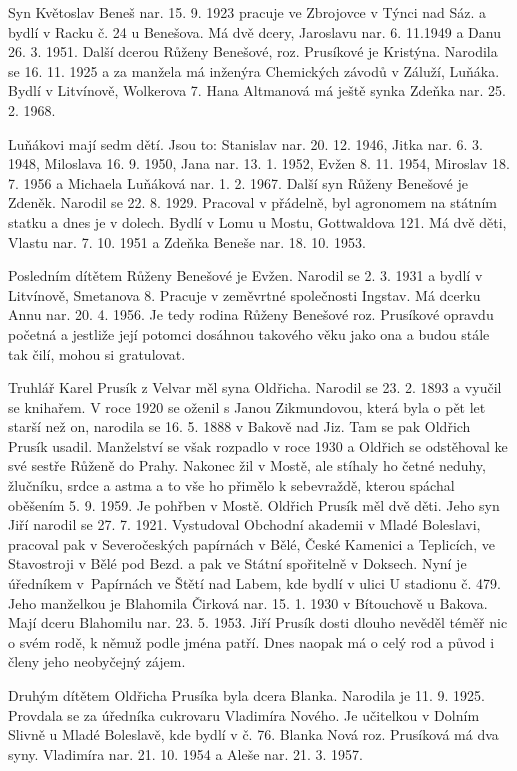\documentclass[../dejiny-rodu-prusiku.tex]{subfiles}
\begin{document}
Syn Květoslav Beneš nar. 15. 9. 1923 pracuje ve Zbrojovce v Týnci nad Sáz. a bydlí v Racku č. 24 u Benešova. Má dvě dcery, Jaroslavu nar. 6. 11.1949 a Danu 26. 3. 1951. Další dcerou Růženy Benešové, roz. Prusíkové je Kristýna. Narodila se 16. 11. 1925 a za manžela má inženýra Chemických závodů v Záluží, Luňáka. Bydlí v Litvínově, Wolkerova 7. Hana Altmanová má ještě synka Zdeňka nar. 25. 2. 1968.

Luňákovi mají sedm dětí. Jsou to: Stanislav nar. 20. 12. 1946, Jitka nar. 6. 3. 1948, Miloslava 16. 9. 1950, Jana nar. 13. 1. 1952, Evžen 8. 11. 1954, Miroslav 18. 7. 1956 a Michaela Luňáková nar. 1. 2. 1967.
Další syn Růženy Benešové je Zdeněk. Narodil se 22. 8. 1929. Pracoval v přádelně, byl agronomem na státním statku a dnes je v dolech. Bydlí v Lomu u Mostu, Gottwaldova 121. Má dvě děti, Vlastu nar. 7. 10. 1951 a Zdeňka Beneše nar. 18. 10. 1953.

Posledním dítětem Růženy Benešové je Evžen. Narodil se 2. 3. 1931 a bydlí v Litvínově, Smetanova 8. Pracuje v zeměvrtné společnosti Ingstav. Má dcerku Annu nar. 20. 4. 1956. Je tedy rodina Růženy Benešové roz. Prusíkové opravdu početná a jestliže její potomci dosáhnou takového věku jako ona a budou stále tak čilí, mohou si gratulovat.

Truhlář Karel Prusík z Velvar měl syna Oldřicha. Naro­dil se 23. 2. 1893 a vyučil se knihařem. V roce 1920 se oženil s Janou Zikmundovou, která byla o pět let star­ší než on, narodila se 16. 5. 1888 v Bakově nad Jiz. Tam se pak Oldřich Prusík usadil. Manželství se však rozpadlo v roce 1930 a Oldřich se odstěhoval ke své sestře Růženě do Prahy. Nakonec žil v Mostě, ale stíhaly ho četné neduhy, žlučníku, srdce a astma a to vše ho přimělo k sebevraždě, kterou spáchal oběšením 5. 9. 1959. Je pohřben v Mostě. Oldřich Prusík měl dvě děti. Jeho syn Jiří narodil se 27. 7. 1921. Vystudoval Obchodní akademii v Mladé Boleslavi, pracoval pak v Severočeských papírnách v Bělé, České Kamenici a Teplicích, ve Stavostroji v Bělé pod Bezd. a pak ve Státní spořitelně v Doksech. Nyní je úředníkem v Papírnách ve Štětí nad Labem, kde bydlí v ulici U stadionu č. 479. Jeho manželkou je Blahomila Čirková nar. 15. 1. 1930 v Bítouchově u Bakova. Mají dceru Blahomilu nar. 23. 5. 1953. Jiří Prusík dosti dlouho nevěděl téměř nic o svém rodě, k němuž podle jména patří. Dnes naopak má o celý rod a původ i členy jeho neobyčejný zájem.

Druhým dítětem Oldřicha Prusíka byla dcera Blanka. Narodila je 11. 9. 1925. Provdala se za úředníka cukrovaru Vladimíra Nového. Je učitelkou v Dolním Slivně u Mladé Boleslavě, kde bydlí v č. 76. Blanka Nová roz. Prusíková má dva syny. Vladimíra nar. 21. 10. 1954 a Aleše nar. 21. 3. 1957.
\end{document}
